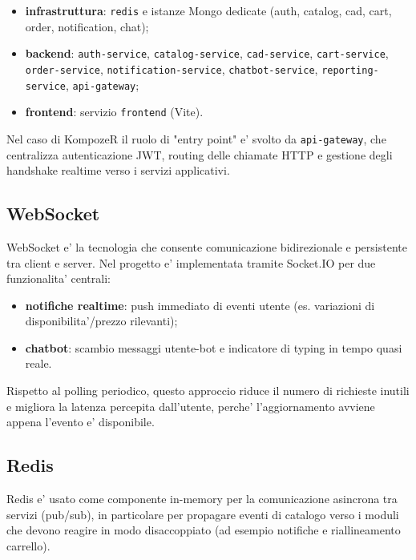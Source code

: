 \begin{itemize}
	\item \textbf{infrastruttura}: \texttt{redis} e istanze Mongo dedicate (auth, catalog, cad, cart, order, notification, chat);
	\item \textbf{backend}: \texttt{auth-service}, \texttt{catalog-service}, \texttt{cad-service}, \texttt{cart-service}, \texttt{order-service}, \texttt{notification-service}, \texttt{chatbot-service}, \texttt{reporting-service}, \texttt{api-gateway};
	\item \textbf{frontend}: servizio \texttt{frontend} (Vite).
\end{itemize}

Nel caso di KompozeR il ruolo di "entry point" e' svolto da \texttt{api-gateway}, che centralizza autenticazione JWT, routing delle chiamate HTTP e gestione degli handshake realtime verso i servizi applicativi.

\subsection{WebSocket}

WebSocket e' la tecnologia che consente comunicazione bidirezionale e persistente tra client e server. 
Nel progetto e' implementata tramite Socket.IO per due funzionalita' centrali:

\begin{itemize}
	\item \textbf{notifiche realtime}: push immediato di eventi utente (es. variazioni di disponibilita'/prezzo rilevanti);
	\item \textbf{chatbot}: scambio messaggi utente-bot e indicatore di typing in tempo quasi reale.
\end{itemize}

Rispetto al polling periodico, questo approccio riduce il numero di richieste inutili e migliora la latenza percepita dall'utente, perche' l'aggiornamento avviene appena l'evento e' disponibile.

\subsection{Redis}

Redis e' usato come componente in-memory per la comunicazione asincrona tra servizi (pub/sub), in particolare per propagare eventi di catalogo verso i moduli che devono reagire in modo disaccoppiato (ad esempio notifiche e riallineamento carrello).

\newpage